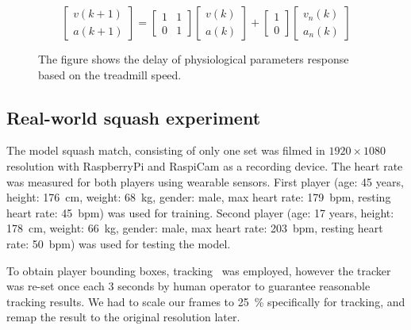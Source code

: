 \begin{equation} \label{eq:kalman}
    \begin{bmatrix}
		v(k + 1) \\ a(k + 1)
	\end{bmatrix}
    =
    \begin{bmatrix}
		1 & 1 \\ 0 & 1
	\end{bmatrix}
    \begin{bmatrix}
		v(k) \\ a(k)
	\end{bmatrix}
    +
    \begin{bmatrix}
		1 \\ 0
	\end{bmatrix}
    \begin{bmatrix}
		v_{n}(k) \\ a_n(k)
	\end{bmatrix}
\end{equation}

\begin{figure}[!htb]
	\centering
    \caption{The figure shows the delay of physiological parameters response based on the treadmill speed.}
    \label{fig:zakasnitev}
\end{figure}


\subsection{Real-world squash experiment}

The model squash match, consisting of only one set was filmed in $1920 \times 1080$ resolution with RaspberryPi and RaspiCam as a recording device. The heart rate was measured for both players using wearable sensors. First player (age: 45 years, height: \SI{176}{\cm}, weight: \SI{68}{\kg}, gender: male, max heart rate: \SI{179}{bpm}, resting heart rate: \SI{45}{bpm}) was used for training. Second player (age: 17 years, height: \SI{178}{\cm}, weight: \SI{66}{\kg}, gender: male, max heart rate: \SI{203}{bpm}, resting heart rate: \SI{50}{bpm}) was used for testing the model.

To obtain player bounding boxes, tracking~\cite{danelljan2014adaptive} was employed, however the tracker was re-set once each 3 seconds by human operator to guarantee reasonable tracking results. We had to scale our frames to \SI{25}{\%} specifically for tracking, and remap the result to the original resolution later.

